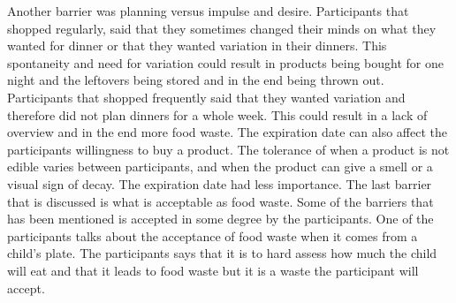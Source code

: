 Another barrier was planning versus impulse and desire. Participants that shopped regularly, said that they sometimes changed their minds on what they wanted for dinner or that they wanted variation in their dinners. This spontaneity and need for variation could result in products being bought for one night and the leftovers being stored and in the end being thrown out. Participants that shopped frequently said that they wanted variation and therefore did not plan dinners for a whole week. This could result in a lack of overview and in the end more food waste. The expiration date can also affect the participants willingness to buy a product. The tolerance of when a product is not edible varies between participants, and when the product can give a smell or a visual sign of decay. The expiration date had less importance. The last barrier that is discussed is what is acceptable as food waste. Some of the barriers that has been mentioned is accepted in some degree by the participants. One of the participants talks about the acceptance of food waste when it comes from a child's plate. The participants says that it is to hard assess how much the child will eat and that it leads to food waste but it is a waste the participant will accept.